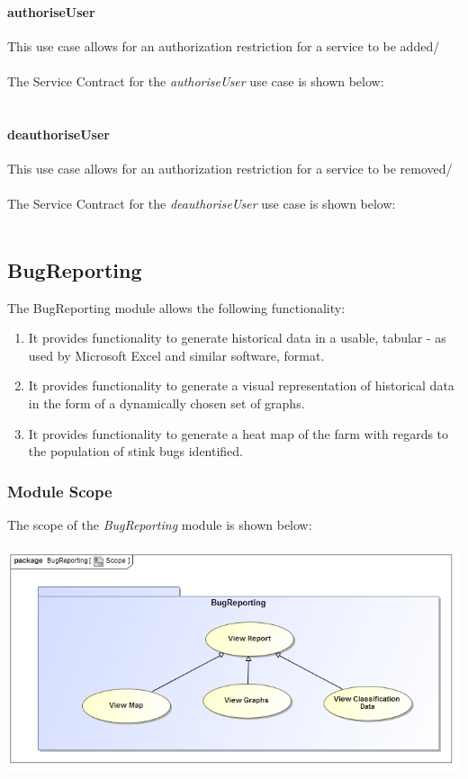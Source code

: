 \documentclass[11pt,a4paper,titlepage]{article}
\begin{document}
		\paragraph{authoriseUser }
		This use case allows for an authorization restriction for a service to be added/\\\hfill\\
		The Service Contract for the \textit{authoriseUser} use case is shown below:\\\hfill\\
		\paragraph{deauthoriseUser }
				This use case allows for an authorization restriction for a service to be removed/\\\hfill\\
		The Service Contract for the \textit{deauthoriseUser} use case is shown below:\\\hfill\\
		
		
		
	\subsection{BugReporting}
	The BugReporting module allows the following functionality:
	\begin{enumerate}
		\item It provides functionality to generate historical data in a usable, tabular - as used by Microsoft Excel and similar software, format.
		\item It provides functionality to generate a visual representation of historical data in the form of a dynamically chosen set of graphs.
		\item It provides functionality to generate a heat map of the farm with regards to the population of stink bugs identified.
	\end{enumerate}
		\subsubsection{Module Scope}
		The scope of the \textit{BugReporting} module is shown below:\\
		\hfill\\
			\includegraphics[width=\linewidth]{ReportingScope}
\end{document}
